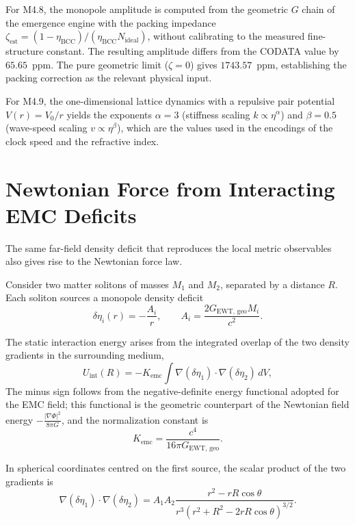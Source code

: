 \documentclass[10pt,a4paper]{article}
\begin{document}
For M4.8, the monopole amplitude is computed from the geometric $G$
chain of the emergence engine with the packing impedance
$\zeta_{\text{est}} = (1-\eta_{\text{BCC}})/(\eta_{\text{BCC}}N_{\text{ideal}})$,
without calibrating to the measured fine-structure constant. The
resulting amplitude differs from the CODATA value by $65.65$~ppm. The
pure geometric limit ($\zeta = 0$) gives $1743.57$~ppm, establishing
the packing correction as the relevant physical input.

For M4.9, the one-dimensional lattice dynamics with a repulsive pair
potential $V(r) = V_0/r$ yields the exponents $\alpha = 3$ (stiffness
scaling $k \propto \eta^{\alpha}$) and $\beta = 0.5$ (wave-speed
scaling $v \propto \eta^{\beta}$), which are the values used in the
encodings of the clock speed and the refractive index.


\section{Newtonian Force from Interacting EMC Deficits}
\label{sec:newtonian_emc_force}

The same far-field density deficit that reproduces the local metric
observables also gives rise to the Newtonian force law.

Consider two matter solitons of masses \(M_1\) and \(M_2\), separated
by a distance \(R\). Each soliton sources a monopole density deficit
\begin{equation}
	\delta\eta_i(r)
	=
	-\frac{A_i}{r}
	,
	\qquad
	A_i
	=
	\frac{2G_{\text{EWT, geo}} M_i}{c^2}
	.
\end{equation}

The static interaction energy arises from the integrated overlap of the two
density gradients in the surrounding medium,
\begin{equation}
	U_{\text{int}}(R)
	=
	-K_{\text{emc}}
	\int
	\nabla(\delta\eta_1)
	\cdot
	\nabla(\delta\eta_2)
	\,dV
	,
\end{equation}
The minus sign follows from the negative-definite energy functional adopted for the EMC field; this functional is the geometric counterpart of the Newtonian field energy \(-\frac{|\nabla\Phi|^2}{8\pi G}\), and the normalization constant is
\begin{equation}
	K_{\text{emc}}
	=
	\frac{c^4}{16\pi G_{\text{EWT, geo}}}
	.
\end{equation}

In spherical coordinates centred on the first source, the scalar
product of the two gradients is
\begin{equation}
	\nabla(\delta\eta_1)
	\cdot
	\nabla(\delta\eta_2)
	=
	A_1 A_2
	\frac{r^2 - rR\cos\theta}
	{r^{3}(r^{2}+R^{2}-2rR\cos\theta)^{3/2}}
	.
\end{equation}
\end{document}
